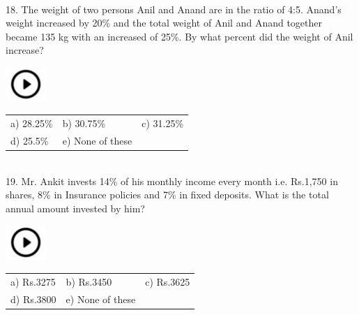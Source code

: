 \documentclass{article}
\begin{document}
                                                    

\noindent 

\noindent 

\noindent 

\noindent \\
18. The weight of two persons Anil and Anand are in the ratio of 4:5. Anand's weight increased by 20\% and the total weight of Anil and Anand together became 135 kg with an increased of 25\%. By what percent did the weight of Anil increase?

\noindent 

\noindent   \includegraphics*[width=0.60in, height=0.52in]{images/image1}  
\begin{tabular}{p{1.7in} p{1.6in} p{1.6in}} \\ 
a) 28.25\%       &  b) 30.75\%     &   c) 31.25\%   \\
 d) 25.5\%   &       e) None of these \\
\end{tabular}
                                       

\noindent 

\noindent 

\noindent 

\noindent \\
19. Mr. Ankit invests 14\% of his monthly income every month i.e. Rs.1,750 in shares, 8\% in Insurance policies and 7\% in fixed deposits. What is the total annual amount invested by him?

\noindent 

\noindent   \includegraphics*[width=0.60in, height=0.52in]{images/image1}
\begin{tabular}{p{1.7in} p{1.6in} p{1.6in}} \\ 
a) Rs.3275      &  b) Rs.3450     &   c) Rs.3625     \\
d) Rs.3800   &       e) None of these\\
\end{tabular}

                                  

\noindent 
\end{document}
